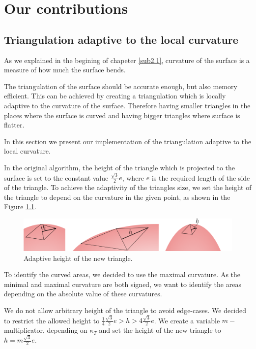 \chapter{Our contributions}
\label{chap3}

\section{Triangulation adaptive to the local curvature}
\label{sub3.1}

As we explained in the begining of chapeter \ref{sub2.1}, curvature of the surface
is a measure of how much the surface bends.

The triangulation of the surface should be accurate enough, but also memory efficient.
This can be achieved by creating a triangulation which is locally adaptive to the
curvature of the surface. Therefore having smaller triangles in the places where
the surface is curved and having bigger triangles where surface is flatter.

In this section we present our implementation of the triangulation adaptive
to the local curvature.

In the original algorithm, the height of the triangle which is projected
to the surface is set to the constant value $\frac{\sqrt{3}}{2}e$, where $e$ 
is the required length of the side of the triangle. To achieve the adaptivity
of the triangles size, we set the height of the triangle to depend on the curvature in
the given point, as shown in the Figure \ref{img:15}.

\begin{figure}
    \centerline{\includegraphics[scale=0.5]{images/img15}}
    \caption[Adaptive height of the new triangle]
    {Adaptive height of the new triangle.}
    \label{img:15}
\end{figure}

To identify the curved areas, we decided to use the maximal curvature. As the minimal
and maximal curvature are both signed, we want to identify the areas depending on 
the absolute value of these curvatures.

We do not allow arbitrary height of the triangle to avoid edge-cases. We decided
to restrict the allowed height to $\frac{1}{4}\frac{\sqrt{3}}{2}e>h>4\frac{\sqrt{3}}{2}e$.
We create a variable $m-$multiplicator, depending on $\kappa_T$ and set the height of
the new triangle to $h=m\frac{\sqrt{3}}{2}e$.

